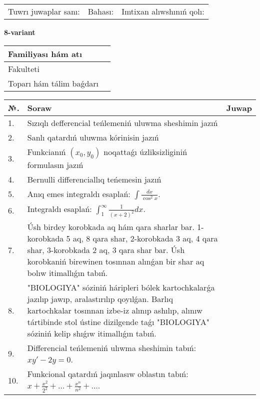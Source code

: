 \documentclass{article}
\begin{document}
\vspace{1cm}

\begin{tabular}{ c c c }
Tuwrı juwaplar sanı: \underline{\hspace{2cm}} & Bahası: \underline{\hspace{2cm}} & Imtixan alıwshınıń qolı: \underline{\hspace{2cm}} \\
\end{tabular}

\newpage

\begin{center}\textbf{8-variant}\end{center}

\bgroup
\def\arraystretch{1.5}
\begin{tabular}{ |m{6cm}|m{10cm}| }
  \hline
  Familiyası hám atı & \\
  \hline
  Fakulteti &\\
  \hline
  Toparı hám tálim baǵdarı & \\
  \hline
\end{tabular}
\egroup

\vspace{0.5cm}

\bgroup
\def\arraystretch{2}
\begin{tabular}{ |l|m{8cm}|m{7cm}| }
  \hline
  №. & Soraw & Juwap \\
  \hline
  1. & Sızıqlı defferencial teńlemeniń uluwma sheshimin jazıń &  \\
  \hline
  2. & Sanlı qatardıń uluwma kórinisin jazıń &  \\
  \hline
  3. & Funkcianıń $(x_{0}, y_{0})$ noqattaǵı úzliksizliginiń formulasın jazıń &  \\
  \hline
  4. & Bernulli differenciallıq teńemesin jazıń &  \\
  \hline
  5. & Anıq emes integraldı esaplań: $\displaystyle\int \frac{dx}{\cos^{2}x}$. &  \\
  \hline
  6. & Integraldı esaplań: $\displaystyle\int_{1}^{\infty}{\frac{1}{\left( x + 2 \right)^{2}}dx }$. &  \\
  \hline
  7. & Úsh birdey korobkada aq hám qara sharlar bar. 1-korobkada 5 aq, 8 qara shar, 2-korobkada 3 aq, 4 qara shar, 3-korobkada 2 aq, 3 qara shar bar. Úsh korobkaniń birewinen tosınnan alınǵan bir shar aq bolıw itimallıǵın tabıń. &  \\
  \hline
  8. & "BIOLOGIYA" sóziniń háripleri bólek kartochkalarǵa jazılıp jawıp, aralastırılıp qoyılǵan. Barlıq kartochkalar tosınnan izbe-iz alınıp ashılıp, alınıw tártibinde stol ústine dizilgende taǵı "BIOLOGIYA" sóziniń kelip shıǵıw itimallıǵın tabıń. &  \\
  \hline
  9. & Differencial teńlemeniń ulıwma sheshimin tabıń: $xy' - 2y = 0$. &  \\
  \hline
  10. & Funkcional qatardıń jaqınlasıw oblastın tabıń: $\displaystyle x + \frac{x^{2}}{2^{2}} + \ldots + \frac{x^{n}}{n^{2}} + \ldots$. &  \\
  \hline
\end{tabular}
\egroup
\end{document}

